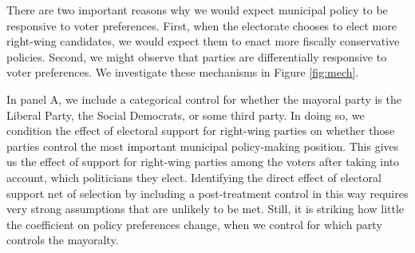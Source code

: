 \documentclass[a4paper,12pt]{article}
\begin{document}
There are two important reasons why we would expect municipal policy to be responsive to voter preferences. First, when the electorate chooses to elect more right-wing candidates, we would expect them to enact more fiscally conservative policies. Second, we might observe that parties are differentially responsive to voter preferences. We investigate these mechanisms in Figure \ref{fig:mech}.

In panel A, we include a categorical control for whether the mayoral party is the Liberal Party, the Social Democrats, or some third party.  In doing so, we condition the effect of electoral support for right-wing parties on whether those parties control the most important municipal policy-making position. This gives us the effect of support for right-wing parties among the voters after taking into account, which politicians they elect. Identifying the direct effect of electoral support net of selection by including a post-treatment control in this way requires very strong assumptions that are unlikely to be met. Still, it is striking how little the coefficient on policy preferences change, when we control for which party controls the mayoralty. 
\end{document}
